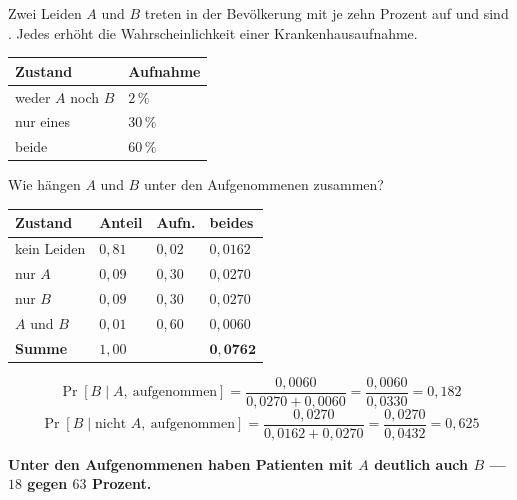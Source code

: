 \begin{aufgabe}
Zwei Leiden $A$ und $B$ treten in der Bevölkerung mit je zehn Prozent auf und sind . Jedes erhöht die Wahrscheinlichkeit einer Krankenhausaufnahme.

\begin{center}
{\small
\renewcommand{\arraystretch}{1.48}
\begin{tabular}{@{}P{3.0cm}P{2.6cm}@{}}
\toprule
\textbf{Zustand} & \textbf{Aufnahme}\\
\midrule
weder $A$ noch $B$ & $2\,\%$\\
nur eines & $30\,\%$\\
beide & $60\,\%$\\
\bottomrule
\end{tabular}}
\end{center}
Wie hängen $A$ und $B$ unter den Aufgenommenen zusammen?

\loesung
{}
\begin{center}
{\small
\renewcommand{\arraystretch}{1.48}
\begin{tabular}{@{}P{2.4cm}P{2.4cm}P{1.8cm}P{2.2cm}@{}}
\toprule
\textbf{Zustand} & \textbf{Anteil} & \textbf{Aufn.} & \textbf{beides}\\
\midrule
kein Leiden & $0{,}81$ & $0{,}02$ & $0{,}0162$\\
nur $A$ & $0{,}09$ & $0{,}30$ & $0{,}0270$\\
nur $B$ & $0{,}09$ & $0{,}30$ & $0{,}0270$\\
$A$ und $B$ & $0{,}01$ & $0{,}60$ & $0{,}0060$\\
\midrule
\textbf{Summe} & $1{,}00$ & & $\mathbf{0{,}0762}$\\
\bottomrule
\end{tabular}}
\end{center}

\[ \Pr[B \mid A,\ \text{aufgenommen}] = \frac{0{,}0060}{0{,}0270+0{,}0060} = \frac{0{,}0060}{0{,}0330} = 0{,}182 \]
\[ \Pr[B \mid \text{nicht } A,\ \text{aufgenommen}] = \frac{0{,}0270}{0{,}0162+0{,}0270} = \frac{0{,}0270}{0{,}0432} = 0{,}625 \]

\begin{center}
\begin{minipage}{0.9\textwidth}
\textbf{Unter den Aufgenommenen haben Patienten mit $A$ deutlich  auch $B$ --- $18$ gegen $63$ Prozent.}
\end{minipage}
\end{center}


\end{aufgabe}
